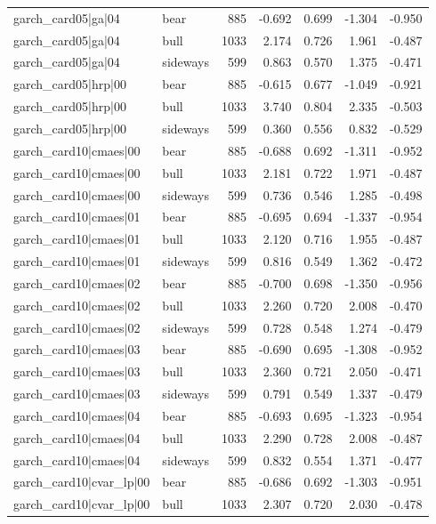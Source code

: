 \begin{table}
\begin{tabular}{llrrrrr}
garch\_card05|ga|04 & bear & 885 & -0.692 & 0.699 & -1.304 & -0.950 \\
garch\_card05|ga|04 & bull & 1033 & 2.174 & 0.726 & 1.961 & -0.487 \\
garch\_card05|ga|04 & sideways & 599 & 0.863 & 0.570 & 1.375 & -0.471 \\
garch\_card05|hrp|00 & bear & 885 & -0.615 & 0.677 & -1.049 & -0.921 \\
garch\_card05|hrp|00 & bull & 1033 & 3.740 & 0.804 & 2.335 & -0.503 \\
garch\_card05|hrp|00 & sideways & 599 & 0.360 & 0.556 & 0.832 & -0.529 \\
garch\_card10|cmaes|00 & bear & 885 & -0.688 & 0.692 & -1.311 & -0.952 \\
garch\_card10|cmaes|00 & bull & 1033 & 2.181 & 0.722 & 1.971 & -0.487 \\
garch\_card10|cmaes|00 & sideways & 599 & 0.736 & 0.546 & 1.285 & -0.498 \\
garch\_card10|cmaes|01 & bear & 885 & -0.695 & 0.694 & -1.337 & -0.954 \\
garch\_card10|cmaes|01 & bull & 1033 & 2.120 & 0.716 & 1.955 & -0.487 \\
garch\_card10|cmaes|01 & sideways & 599 & 0.816 & 0.549 & 1.362 & -0.472 \\
garch\_card10|cmaes|02 & bear & 885 & -0.700 & 0.698 & -1.350 & -0.956 \\
garch\_card10|cmaes|02 & bull & 1033 & 2.260 & 0.720 & 2.008 & -0.470 \\
garch\_card10|cmaes|02 & sideways & 599 & 0.728 & 0.548 & 1.274 & -0.479 \\
garch\_card10|cmaes|03 & bear & 885 & -0.690 & 0.695 & -1.308 & -0.952 \\
garch\_card10|cmaes|03 & bull & 1033 & 2.360 & 0.721 & 2.050 & -0.471 \\
garch\_card10|cmaes|03 & sideways & 599 & 0.791 & 0.549 & 1.337 & -0.479 \\
garch\_card10|cmaes|04 & bear & 885 & -0.693 & 0.695 & -1.323 & -0.954 \\
garch\_card10|cmaes|04 & bull & 1033 & 2.290 & 0.728 & 2.008 & -0.487 \\
garch\_card10|cmaes|04 & sideways & 599 & 0.832 & 0.554 & 1.371 & -0.477 \\
garch\_card10|cvar\_lp|00 & bear & 885 & -0.686 & 0.692 & -1.303 & -0.951 \\
garch\_card10|cvar\_lp|00 & bull & 1033 & 2.307 & 0.720 & 2.030 & -0.478 \\

\end{tabular}
\end{table}
